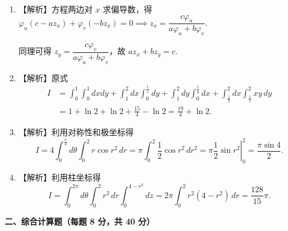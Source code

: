 \documentclass[a4paper,11pt]{ctexart}
\begin{document}
\begin{enumerate}[label=\arabic*., leftmargin=2em, itemsep=0.9em, topsep=0.6em]
  \item 【解析】方程两边对 $x$ 求偏导数，得 $\varphi_u(c - az_x) + \varphi_v(-bz_x) = 0 \implies z_x = \dfrac{c\varphi_u}{a\varphi_u + b\varphi_v}$.

  同理可得 $z_y = \dfrac{c\varphi_v}{a\varphi_u + b\varphi_v}$，故 $az_x + bz_y = c$.

  \item 【解析】原式
  \begin{align*}
    I &= \int_0^1 \int_0^1 dxdy + \int_1^2 dx \int_0^{\frac{1}{x}} dy + \int_1^2 dy \int_0^{\frac{1}{y}} dx + \int_{\frac{1}{2}}^2 dx \int_{\frac{1}{x}}^2 xy\,dy \\
      &= 1 + \ln 2 + \ln 2 + \frac{15}{4} - \ln 2 = \frac{19}{4} + \ln 2.
  \end{align*}

  \item 【解析】利用对称性和极坐标得
  \[
    I = 4\int_0^{\frac{\pi}{4}} d\theta \int_0^2 r\cos r^2\,dr = \pi\int_0^2 \frac{1}{2}\cos r^2\,dr^2 = \pi\left.\frac{1}{2}\sin r^2\right|_0^2 = \frac{\pi\sin 4}{2}.
  \]

  \item 【解析】利用柱坐标得
  \[
    I = \int_0^{2\pi} d\theta \int_0^2 r^2\,dr \int_0^{4-r^2} dz = 2\pi \int_0^2 r^2(4-r^2)\,dr = \frac{128}{15}\pi.
  \]
\end{enumerate}

\vspace{0.6em}

\textbf{二、综合计算题（每题 8 分，共 40 分）}
\end{document}
